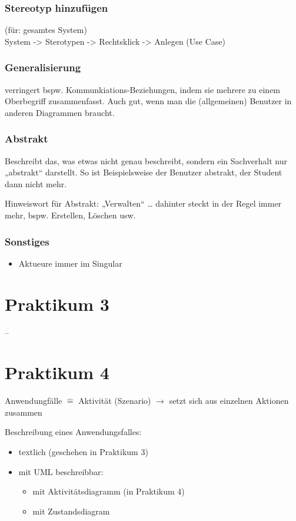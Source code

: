\subsection{Stereotyp hinzufügen}
(für: gesamtes System)\\
System -> Sterotypen -> Rechtsklick -> Anlegen (Use Case)

\subsection{Generalisierung}
verringert bspw. Kommunkiations-Beziehungen, indem sie mehrere zu einem Oberbegriff zusammenfasst. Auch gut, wenn man die (allgemeinen) Benutzer in anderen Diagrammen braucht.

\subsection{Abstrakt}
Beschreibt das, was etwas nicht genau beschreibt, sondern ein Sachverhalt nur „abstrakt“ darstellt. So ist Beispielsweise der Benutzer abstrakt, der Student dann nicht mehr.

Hinweiswort für Abstrakt: „Verwalten“ … dahinter steckt in der Regel immer mehr, bspw. Erstellen, Löschen usw.
\subsection{Sonstiges}
\begin{itemize}
\item Aktueure immer im Singular
\end{itemize}

\chapter{Praktikum 3}
--

\chapter{Praktikum 4}
Anwendungfälle $\hat{=}$ Aktivität (Szenario) $\to$ setzt sich aus einzelnen Aktionen zusammen

Beschreibung eines Anwendungsfalles:
\begin{itemize}
\item textlich (geschehen in Praktikum 3)
\item mit UML beschreibbar:
\begin{itemize}
\item mit Aktivitätsdiagramm (in Praktikum 4)
\item mit Zustandsdiagram
\end{itemize}
\end{itemize}





